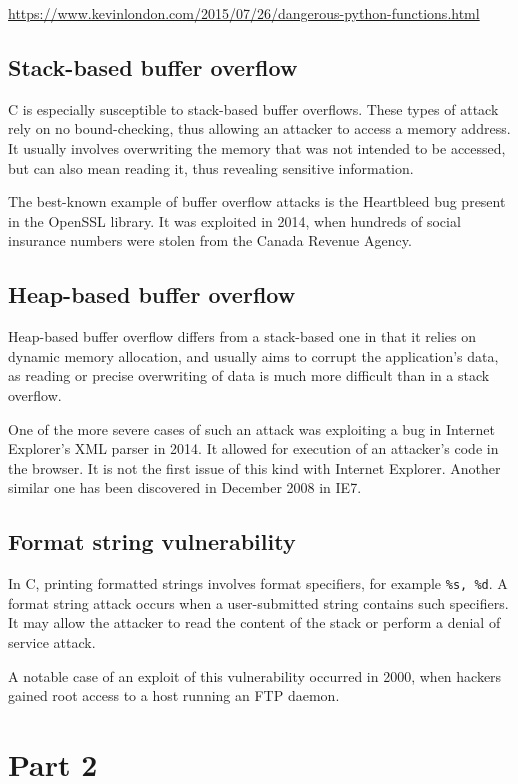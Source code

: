 \documentclass[11pt,journal]{article}
\begin{document}
	\url{https://www.kevinlondon.com/2015/07/26/dangerous-python-functions.html}
	
	\subsection{Stack-based buffer overflow}
	C is especially susceptible to stack-based buffer overflows. These types of attack rely on no bound-checking, thus allowing an attacker to access a memory address. It usually involves overwriting the memory that was not intended to be accessed, but can also mean reading it, thus revealing sensitive information.
	
	The best-known example of buffer overflow attacks is the Heartbleed bug present in the OpenSSL library. It was exploited in 2014, when hundreds of social insurance numbers were stolen from the Canada Revenue Agency\cite{heartbleed news}.
	
	\subsection{Heap-based buffer overflow}
	Heap-based buffer overflow differs from a stack-based one in that it relies on dynamic memory allocation, and usually aims to corrupt the application's data, as reading or precise overwriting of data is much more difficult than in a stack overflow. 
	
	One of the more severe cases of such an attack was exploiting a bug in Internet Explorer's XML parser in 2014. It allowed for execution of an attacker's code in the browser. It is not the first issue of this kind with Internet Explorer. Another similar one has been discovered in December 2008 in IE7\cite{IE2}.
	
	\subsection{Format string vulnerability}
	In C, printing formatted strings involves format specifiers, for example \texttt{\%s, \%d}. A format string attack occurs when a user-submitted string contains such specifiers. It may allow the attacker to read the content of the stack or perform a denial of service attack.
	
	A notable case of an exploit of this vulnerability occurred in 2000, when hackers gained root access to a host running an FTP daemon\cite{format string}.
	
	
	
	\section{Part 2}
	
\end{document}
